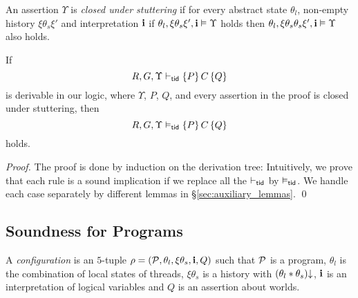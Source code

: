 \begin{defin}\label{def:stuttering}
An assertion $\Upsilon$ is \emph{closed under stuttering}
if for every abstract state $\theta_l$, non-empty history $\xi\theta_s\xi'$ 
and interpretation ${\bf i}$ if
$\theta_l,\xi\theta_s\xi',{\bf i}\vDash \Upsilon$
holds then
$\theta_l,\xi\theta_s\theta_s\xi',{\bf i}\vDash \Upsilon$
also holds.
\end{defin}



\begin{theorem}\label{the:sound:thread}
  If 
  $$
  R,G,\Upsilon \vdash_{\sf tid} \{ P \} \, C \, \{ Q \}
  $$  
  is derivable in our logic, where $\Upsilon$, $P$, $Q$, and every assertion in the proof is closed under stuttering, %
  then
  $$  
  R,G,\Upsilon \vDash_{\sf tid} \{ P \} \, C \, \{ Q \}
  $$ 
  holds.
\end{theorem}

\begin{proof}
The proof is done by induction on the derivation tree:
Intuitively, we prove that each rule is a sound implication if we replace all the $\vdash_{\sf tid}$ by $\vDash_{\sf tid}$. 
We handle each case separately by different lemmas in \S\ref{sec:auxiliary_lemmas}.
\qed
\end{proof}




\subsection{Soundness for Programs}

\begin{defin}[Configuration]\label{def:glo-config}
  A \emph{configuration}  
  is an $5$-tuple $\rho =(\mathcal{P},\theta_l,\xi\theta_s,{\bf i},Q)$ 
  such that $\mathcal{P}$ is a program, $\theta_l$ is the combination of 
  local states of threads, $\xi\theta_s$ is a history with
  $(\theta_l*\theta_s)\mathpunct{\downarrow}$,
  ${\bf i}$ is an interpretation of logical variables and
  $Q$ is an assertion about worlds.
\end{defin}  

